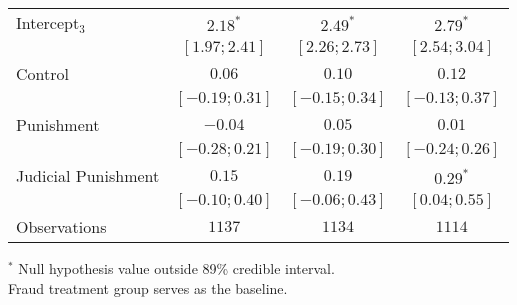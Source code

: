 \begin{table}[h]
\begin{center}
\begin{threeparttable}
\begin{tabular}{l c c c}
Intercept$_3$       & $2.18^{*}$        & $2.49^{*}$        & $2.79^{*}$        \\
                    & $ [ 1.97;  2.41]$ & $ [ 2.26;  2.73]$ & $ [ 2.54;  3.04]$ \\
Control             & $0.06$            & $0.10$            & $0.12$            \\
                    & $ [-0.19;  0.31]$ & $ [-0.15;  0.34]$ & $ [-0.13;  0.37]$ \\
Punishment          & $-0.04$           & $0.05$            & $0.01$            \\
                    & $ [-0.28;  0.21]$ & $ [-0.19;  0.30]$ & $ [-0.24;  0.26]$ \\
Judicial Punishment & $0.15$            & $0.19$            & $0.29^{*}$        \\
                    & $ [-0.10;  0.40]$ & $ [-0.06;  0.43]$ & $ [ 0.04;  0.55]$ \\
\hline
Observations        & $1137$            & $1134$            & $1114$            \\
\hline
\end{tabular}
\begin{tablenotes}[flushleft]
\scriptsize{$^*$ Null hypothesis value outside 89\% credible interval.  \\
Fraud treatment group serves as the baseline.}
\end{tablenotes}
\end{threeparttable}
\label{table:ol_main_ru_npol_1223}
\end{center}
\end{table}
